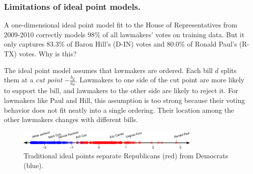 
\subsubsection{Limitations of ideal point models.}

A one-dimensional ideal point model fit to the House of
Representatives from 2009-2010 correctly models 98\% of all lawmakers'
votes on training data. But it only captures 83.3\% of Baron Hill's
(D-IN) votes and 80.0\% of Ronald Paul's (R-TX) votes.  Why is this?

The ideal point model assumes that lawmakers are ordered.  Each bill
$d$ splits them at a \emph{cut point} $-\frac{b_d}{a_d}$.  Lawmakers
to one side of the cut point are more likely to support the bill, and
lawmakers to the other side are likely to reject it.  For lawmakers
like Paul and Hill, this assumption is too strong because
their voting behavior does not fit neatly into a single ordering.
Their location among the other lawmakers changes with different bills.
\begin{figure}
  \begin{center}
    \vspace{-10pt}
    \includegraphics[width=0.8\textwidth,height=0.1\textwidth]{chapter_spatial_voting_with_text/figures/3393_example_ideal_points_final.pdf}
    \vspace{-10pt}
  \end{center}
  \caption{Traditional ideal points separate Republicans (red) from Democrats (blue).}
  \label{fig:classic_ideal_points}
  \vspace{-5pt}
\end{figure}

